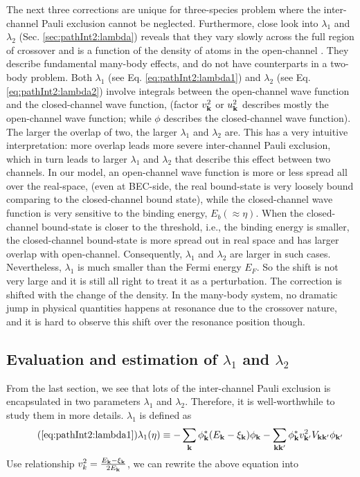The next three corrections are unique for three-species problem where the inter-channel Pauli exclusion cannot be neglected.  
Furthermore,  close look into $\lambda_1$ and $\lambda_2$ (Sec. \ref{sec:pathInt2:lambda}) reveals that they vary slowly across the full region of crossover and is a function of the density of atoms in the open-channel .  They describe  fundamental many-body effects, and do not have counterparts in a two-body problem.  
Both $\lambda_{1}$ (see Eq. \ref{eq:pathInt2:lambda1})  and $\lambda_{2}$ (see Eq. \ref{eq:pathInt2:lambda2})  involve integrals between the open-channel wave function and the closed-channel wave function, (factor $v_{\mathbf{k}}^{2}$ or $u_{\mathbf{k}}^{2}$ describes mostly the open-channel wave function; while $\phi$ describes the closed-channel wave function). The larger the overlap of two, the larger $\lambda_{1}$ and $\lambda_{2}$ are.  This has a very intuitive interpretation:  more overlap leads more severe inter-channel Pauli exclusion, which in turn leads to larger $\lambda_{1}$  and $\lambda_{2}$  that describe this effect between two  channels.  In our model, an open-channel wave function is more or less spread all over the real-space, (even at BEC-side, the real bound-state is very loosely bound comparing to the closed-channel bound state), while the closed-channel wave function is very sensitive to the binding energy, $E_{b}(\approx\eta)$.  When the closed-channel  bound-state is closer to the threshold, i.e.,  the binding energy  is smaller, the closed-channel bound-state is more spread out  in real space and has larger overlap with open-channel. Consequently,  $\lambda_{1}$ and $\lambda_{2}$ are larger in such cases.                           Nevertheless, $\lambda_1$ is much smaller than the  Fermi energy $E_{F}$.  So the shift is not very large and it is still all right to treat it as a perturbation.  The correction is   shifted with the change of the density.  In the many-body system, no dramatic jump in physical quantities happens at resonance due to the crossover nature, and it is hard to observe this shift over the resonance position though.  %


\subsection{Evaluation and estimation of $\lambda_{1}$ and $\lambda_{2}$\label{sec:pathInt2:lambda}}
From the last section, we  see  that lots of the inter-channel Pauli exclusion is encapsulated in two parameters $\lambda_{1}$ and $\lambda_{2}$.   Therefore, it is well-worthwhile to study them in more details.  $\lambda_{1}$ is defined as 
\begin{equation}\tag{\ref{eq:pathInt2:lambda1}}
\lambda_{1}(\eta)\equiv-\sum_{\vk}{\phi_{\vk}^{*}}{(E_{\vk}-\xi_{\vk})}\phi_{\vk}
	-\sum_{\vk\vk'}{\phi_{\vk}^{*}}{v_{\vk'}^{2}V_{\vk\vk'}}\phi_{\vk'}
\end{equation}
Use relationship $v_{k}^{2}=\frac{E_{\mathbf{k}}-\xi_{\mathbf{k}}}{2E_{\mathbf{k}}}$, we can rewrite the above equation into 

